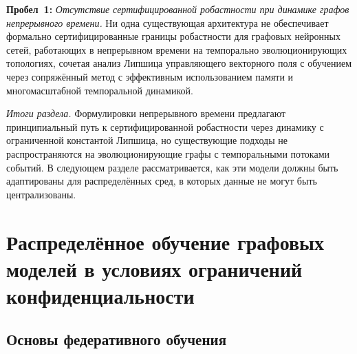 \medskip
\noindent\textbf{Пробел~1:} \emph{Отсутствие сертифицированной робастности при динамике графов непрерывного времени.} Ни одна существующая архитектура не обеспечивает формально сертифицированные границы робастности для графовых нейронных сетей, работающих в непрерывном времени на темпорально эволюционирующих топологиях, сочетая анализ Липшица управляющего векторного поля с обучением через сопряжённый метод с эффективным использованием памяти и многомасштабной темпоральной динамикой.

\medskip
\noindent\textit{Итоги раздела.} Формулировки непрерывного времени предлагают принципиальный путь к сертифицированной робастности через динамику с ограниченной константой Липшица, но существующие подходы не распространяются на эволюционирующие графы с темпоральными потоками событий. В следующем разделе рассматривается, как эти модели должны быть адаптированы для распределённых сред, в которых данные не могут быть централизованы.


\section{Распределённое обучение графовых моделей в условиях ограничений конфиденциальности}
\label{sec:distributed}

\subsection{Основы федеративного обучения}

